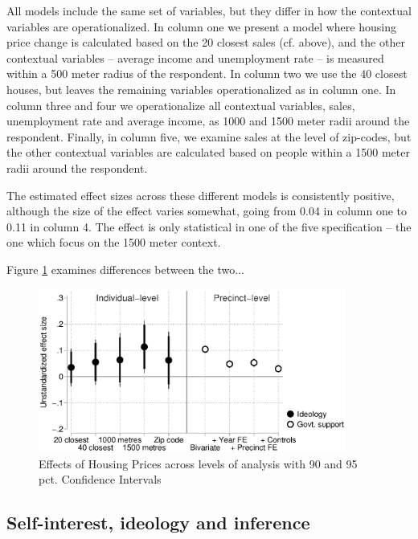 \documentclass[12pt,a4paper]{article}
\begin{document}
All models include the same set of variables, but they differ in how the contextual variables are operationalized. In column one we present a model where housing price change is calculated based on the 20 closest sales (cf. above), and the other contextual variables -- average income and unemployment rate -- is measured within a 500 meter radius of the respondent. In column two we use the 40 closest houses, but leaves the remaining variables operationalized as in column one. In column three and four we operationalize all contextual variables, sales, unemployment rate and average income, as 1000 and 1500 meter radii around the respondent. Finally, in column five, we examine sales at the level of zip-codes, but the other contextual variables are calculated based on people within a 1500 meter radii around the respondent.



The estimated effect sizes across these different models is consistently positive, although the size of the effect varies somewhat, going from 0.04 in column one to 0.11 in column 4. The effect is only statistical in one of the five specification -- the one which focus on the 1500 meter context. 

Figure \ref{comparison} examines differences between the two...



\begin{figure}[htbp!]
	\includegraphics[width=0.9\textwidth]{../figures/comparison.eps}
	\centering
	\caption{Effects of Housing Prices across levels of analysis with 90  and 95 pct. Confidence Intervals}\label{comparison}
\end{figure}


\subsection{Self-interest, ideology and inference}\label{inference}
\end{document}

